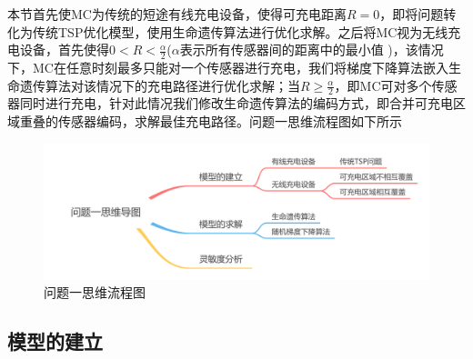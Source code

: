 \documentclass{whutmod}
\newcommand{\upcite}[1]{\textsuperscript{\cite{#1}}}
\begin{document}
\begin{table}[H]
\begin{tablenotes}
		    本节首先使MC为传统的短途有线充电设备，使得可充电距离$R=0$，即将问题转化为传统TSP优化模型，使用生命遗传算法进行优化求解。之后将MC视为无线充电设备，首先使得$0<R<\frac{\alpha }{2}$($\alpha$表示所有传感器间的距离中的最小值 )，该情况下，MC在任意时刻最多只能对一个传感器进行充电，我们将梯度下降算法嵌入生命遗传算法对该情况下的充电路径进行优化求解；当$R\geqslant \frac{\alpha }{2}$，即MC可对多个传感器同时进行充电，针对此情况我们修改生命遗传算法的编码方式，即合并可充电区域重叠的传感器编码，求解最佳充电路径。问题一思维流程图如下所示
			
		  \begin{figure}[H]
				\centering
				\includegraphics[width=\textwidth]{figures/1.png}
				\caption{问题一思维流程图}\label{asdf}
			\end{figure}
		
		
		
		\subsection{模型的建立}

\end{tablenotes}
\end{table}
\end{document}

